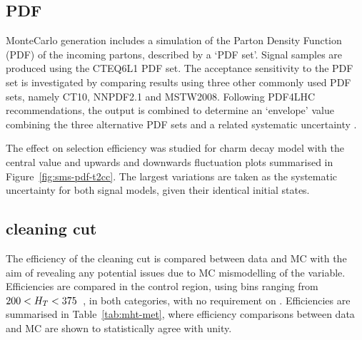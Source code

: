 \subsection{PDF}
MonteCarlo generation includes a simulation of the Parton Density Function (PDF)
of the incoming partons, described by a `PDF set'. Signal samples are produced
using the \textsc{CTEQ6L1} PDF set. The acceptance 
sensitivity to the PDF set is investigated by comparing results using three
other commonly used PDF sets, namely \textsc{CT10}, \textsc{NNPDF2.1} and
\textsc{MSTW2008}. Following PDF4LHC recommendations, the output is 
combined to determine an `envelope' value combining the three alternative PDF 
sets and a related systematic uncertainty \cite{pdf4lhc}.

The effect on selection efficiency was studied for charm decay model with the
central value and upwards and downwards fluctuation plots summarised in
Figure~\ref{fig:sms-pdf-t2cc}. The largest variations are taken as the
systematic uncertainty for both signal models, given their identical initial
states.

\subsection{\mhtmet cleaning cut}
\label{sec:mhtmet_syst}
The efficiency of the \mhtmet cleaning cut is compared between data and MC with 
the aim of revealing any potential issues due to MC mismodelling of the 
variable. Efficiencies are compared in the \mj control region, using \HT bins 
ranging from $200 < H_T < 375$~\gev, in both \nj categories, with no requirement
on \nb. Efficiencies are summarised in Table~\ref{tab:mht-met}, where 
efficiency comparisons between data and MC are shown to statistically agree
with unity.


